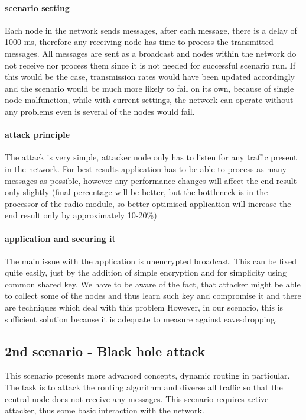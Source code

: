 \documentclass[
  print, %
  table,   %
  nolof,     %
  nolot,     %
           oneside
]{fithesis3}
\begin{document}
    \paragraph{scenario setting}
    Each node in the network sends messages, after each message, there is a delay of 1000 ms, therefore any receiving node has time to process the transmitted messages. All messages are sent as a broadcast and nodes within the network do not receive nor process them since it is not needed for successful scenario run. If this would be the case, transmission rates would have been updated accordingly and the scenario would be much more likely to fail on its own, because of single node malfunction, while with current settings, the network can operate without any problems even is several of the nodes would fail.

    \paragraph{attack principle}
    The attack is very simple, attacker node only has to listen for any traffic present in the network. For best results application has to be able to process as many messages as possible, however any performance changes will affect the end result only slightly (final percentage will be better, but the bottleneck is in the processor of the radio module, so better optimised application will increase the end result only by approximately 10-20\%)
    \paragraph{application and securing it}
    The main issue with the application is unencrypted broadcast. This can be fixed quite easily, just by the addition of simple encryption and for simplicity using common shared key. We have to be aware of the fact, that attacker might be able to collect some of the nodes and thus learn such key and compromise it and there are techniques which deal with this problem %
    However, in our scenario, this is sufficient solution because it is adequate to measure against eavesdropping.

    \subsection{2nd scenario - Black hole attack} \label{subsec:2nd}
    This scenario presents more advanced concepts, dynamic routing in particular. The task is to attack the routing algorithm and diverse all traffic so that the central node does not receive any messages. This scenario requires active attacker, thus some basic interaction with the network.
\end{document}
